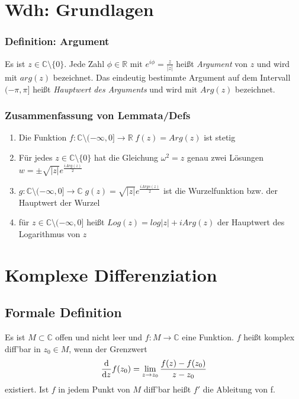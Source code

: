 

\section{Wdh: Grundlagen}
\subsubsection{Definition: Argument}
Es ist $z\in\mathbb{C}\setminus\{0\}$. Jede Zahl $\phi\in\mathbb{R}$ mit $e^{i\phi}=\frac{z}{|z|}$ heißt \textit{Argument} von $z$ und wird mit $arg(z)$ bezeichnet. Das eindeutig bestimmte Argument auf dem Intervall $(-\pi,\pi]$ heißt \textit{Hauptwert des Arguments} und wird mit $Arg(z)$ bezeichnet. 

\subsubsection{Zusammenfassung von Lemmata/Defs}
\begin{enumerate}
    \item Die Funktion $f: \mathbb{C}\setminus(-\infty,0]\to\mathbb{R} \; f(z)=Arg(z)$ ist stetig
    \item Für jedes $z\in\mathbb{C}\setminus\{0\}$ hat die Gleichung $\omega^2=z$ genau zwei Lösungen $w=\pm\sqrt{|z|}e^{\frac{iArg(z)}{2}}$
    \item $g:\mathbb{C}\setminus(-\infty,0]\to\mathbb{C} \; g(z)=\sqrt{|z|}e^{\frac{iArgs(z)}{2}}$ ist die Wurzelfunktion bzw. der Hauptwert der Wurzel
    \item für $z\in\mathbb{C}\setminus(-\infty,0]$ heißt $Log(z)=log|z|+iArg(z)$ der Hauptwert des Logarithmus von $z$
\end{enumerate}

\section{Komplexe Differenziation}
\label{sec:komplexe-differentiation}
\subsection{Formale Definition}
Es ist $M\subset\mathbb{C}$ offen und nicht leer und $f:M\to\mathbb{C}$ eine Funktion. $f$ heißt komplex diff'bar in $z_0\in M$, wenn der Grenzwert 
\begin{equation*}
    \frac{\mathop{}\!\mathrm{d}}{\mathop{}\!\mathrm{d} z}f(z_0) = \lim_{z\to z_0}\frac{f(z)-f(z_0)}{z-z_0}
\end{equation*}
existiert. Ist $f$ in jedem Punkt von $M$ diff'bar heißt $f'$ die Ableitung von f.

